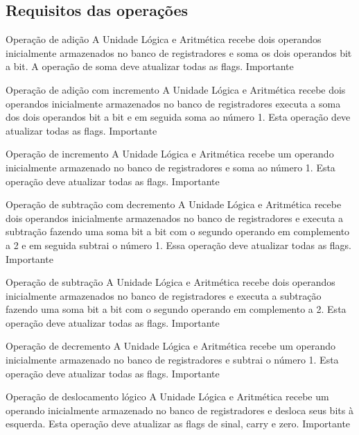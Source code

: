 \documentclass{report}
\begin{document}
     \subsection{Requisitos das operações}
      \begin{functional}

     \requirement
      {Operação de adição}
      {A Unidade Lógica e Aritmética recebe dois operandos inicialmente armazenados no banco de registradores e soma os dois operandos bit a bit. A operação de soma deve atualizar todas as flags.}
      {Importante}

     \requirement
      {Operação de adição com incremento}
      {A Unidade Lógica e Aritmética recebe dois operandos inicialmente armazenados no banco de registradores executa a soma dos dois operandos bit a bit e em seguida soma  ao número 1. Esta operação deve atualizar todas as flags.}
      {Importante}
      
      \requirement
      {Operação de incremento}
      {A Unidade Lógica e Aritmética recebe um operando inicialmente armazenado no banco de registradores e soma ao número 1. Esta operação deve atualizar todas as flags.}
      {Importante}
      
      \requirement
      {Operação de subtração com decremento}
      {A Unidade Lógica e Aritmética recebe dois operandos inicialmente armazenados no banco de registradores e executa a subtração fazendo uma soma  bit a bit com o segundo operando em complemento a 2 e em seguida subtrai o número 1. Essa operação deve atualizar todas as flags.}
      {Importante}
      
      \requirement
      {Operação de subtração}
      {A Unidade Lógica e Aritmética recebe dois operandos inicialmente armazenados no banco de registradores e executa a subtração fazendo uma soma  bit a bit com o segundo operando em complemento a 2. Esta operação deve atualizar todas as flags.}
      {Importante}
      
      \requirement
      {Operação de decremento}
      {A Unidade Lógica e Aritmética recebe um operando inicialmente armazenado no banco de registradores e subtrai o número 1. Esta operação deve atualizar todas as flags.}
      {Importante}
      
       \requirement
      {Operação de deslocamento lógico}
      {A Unidade Lógica e Aritmética recebe um operando inicialmente armazenado no banco de registradores e desloca seus bits à esquerda. Esta operação deve atualizar as flags de sinal, carry e zero.}
      {Importante}
      

\end{functional}
\end{document}
